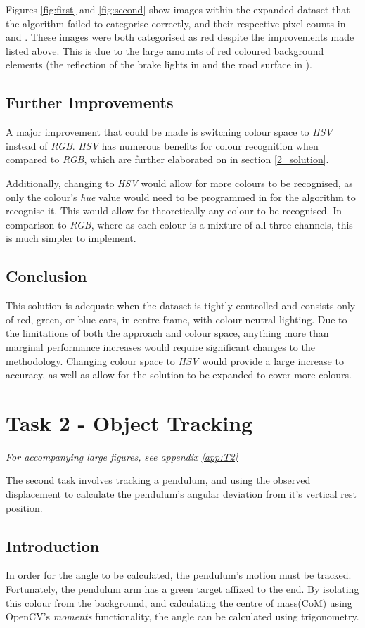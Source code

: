 \documentclass[conference]{IEEEtran}
\begin{document}
Figures \ref{fig:first} and \ref{fig:second} show images within the expanded dataset that the algorithm failed to categorise correctly, and their respective pixel counts in  and . These images were both categorised as red despite the improvements made listed above. This is due to the large amounts of red coloured background elements (the reflection of the brake lights in  and the road surface in ).


\subsection{Further Improvements} \label{sec:further1}
A major improvement that could be made is switching colour space to \textit{HSV} instead of \textit{RGB}. \textit{HSV} has numerous benefits for colour recognition when compared to \textit{RGB}, which are further elaborated on in section \ref{2_solution}.

Additionally, changing to \textit{HSV} would allow for more colours to be recognised, as only the colour's \textit{hue} value would need to be programmed in for the algorithm to recognise it. This would allow for theoretically any colour to be recognised. In comparison to \textit{RGB}, where as each colour is a mixture of all three channels, this is much simpler to implement.
\subsection{Conclusion}
This solution is adequate when the dataset is tightly controlled and consists only of red, green, or blue cars, in centre frame, with colour-neutral lighting. Due to the limitations of both the approach and colour space, anything more than marginal performance increases would require significant changes to the methodology. Changing colour space to \textit{HSV} would provide a large increase to accuracy, as well as allow for the solution to be expanded to cover more colours.

\section{Task 2 - Object Tracking}
\textit{For accompanying large figures, see appendix \ref{app:T2}}

The second task involves tracking a pendulum, and using the observed displacement to calculate the pendulum's angular deviation from it's vertical rest position.
\subsection{Introduction}
In order for the angle to be calculated, the pendulum's motion must be tracked. Fortunately, the pendulum arm has a green target affixed to the end. By isolating this colour from the background, and calculating the centre of mass(CoM) using OpenCV's \textit{moments} functionality, the angle can be calculated using trigonometry.
\end{document}
